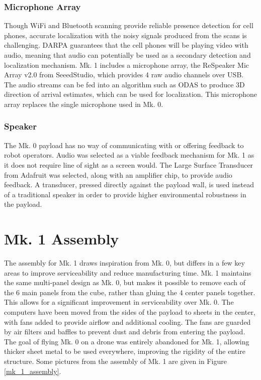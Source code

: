 \subsubsection{Microphone Array}

Though WiFi and Bluetooth scanning provide reliable presence detection for cell phones, accurate localization with the noisy signals produced from the scans is challenging. DARPA guarantees that the cell phones will be playing video with audio, meaning that audio can potentially be used as a secondary detection and localization mechanism. Mk. 1 includes a microphone array, the ReSpeaker Mic Array v2.0 from SeeedStudio, which provides 4 raw audio channels over USB. The audio streams can be fed into an algorithm such as ODAS \cite{grondin2019lightweight} to produce 3D direction of arrival estimates, which can be used for localization. This microphone array replaces the single microphone used in Mk. 0.

\subsubsection{Speaker}

The Mk. 0 payload has no way of communicating with or offering feedback to robot operators. Audio was selected as a viable feedback mechanism for Mk. 1 as it does not require line of sight as a screen would. The Large Surface Transducer from Adafruit was selected, along with an amplifier chip, to provide audio feedback. A transducer, pressed directly against the payload wall, is used instead of a traditional speaker in order to provide higher environmental robustness in the payload.

\section{Mk. 1 Assembly}

The assembly for Mk. 1 draws inspiration from Mk. 0, but differs in a few key areas to improve serviceability and reduce manufacturing time. Mk. 1 maintains the same multi-panel design as Mk. 0, but makes it possible to remove each of the 6 main panels from the cube, rather than gluing the 4 center panels together. This allows for a significant improvement in serviceability over Mk. 0. The computers have been moved from the sides of the payload to sheets in the center, with fans added to provide airflow and additional cooling. The fans are guarded by air filters and baffles to prevent dust and debris from entering the payload. The goal of flying Mk. 0 on a drone was entirely abandoned for Mk. 1, allowing thicker sheet metal to be used everywhere, improving the rigidity of the entire structure. Some pictures from the assembly of Mk. 1 are given in Figure \ref{mk_1_assembly}.

